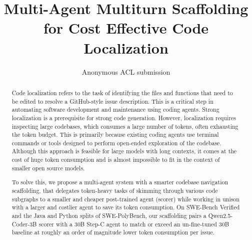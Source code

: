\documentclass[11pt]{article}
\title{Multi-Agent Multiturn Scaffolding for Cost Effective Code Localization }
\author{Anonymous ACL submission}
\begin{document}
\maketitle

\begin{abstract}
Code localization refers to the task of identifying the files and functions that need to be edited to resolve a GitHub-style issue description. This is a critical step in automating software development and maintenance using coding agents.
Strong localization is a prerequisite for strong code generation. 
However, localization requires inspecting large codebases, which consumes a large number of tokens, often exhausting the token budget. This is primarily because existing coding agents use terminal commands or tools designed to perform open-ended exploration of the codebase. 
Although this approach is feasible for large models with long contexts, it comes at the cost of huge token consumption and is almost impossible to fit in the context of smaller open source models. 

To solve this, we propose a multi-agent system with a smarter codebase navigation scaffolding, that delegates token-heavy tasks of skimming through various code subgraphs to a smaller and cheaper post-trained agent (scorer) while working in unison with a larger and costlier agent to save its token consumption.
On SWE-Bench Verified and the Java and Python splits of SWE-PolyBench, our scaffolding pairs a Qwen2.5-Coder-3B scorer with a 30B Step-C agent to match or exceed an un-fine-tuned 30B baseline at roughly an order of magnitude lower token consumption per issue.


\end{abstract}
\end{document}
